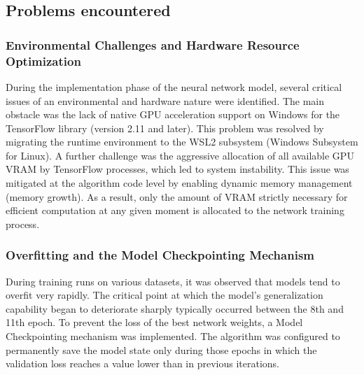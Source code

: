 \documentclass{article}
\begin{document}
\subsection{Problems encountered}
\subsubsection{Environmental Challenges and Hardware Resource Optimization}
During the implementation phase of the neural network model, several critical issues of an environmental and hardware nature were identified. The main obstacle was the lack of native GPU acceleration support on Windows for the TensorFlow library (version 2.11 and later). This problem was resolved by migrating the runtime environment to the WSL2 subsystem (Windows Subsystem for Linux).
A further challenge was the aggressive allocation of all available GPU VRAM by TensorFlow processes, which led to system instability. This issue was mitigated at the algorithm code level by enabling dynamic memory management (memory growth). As a result, only the amount of VRAM strictly necessary for efficient computation at any given moment is allocated to the network training process.
\subsubsection{ Overfitting and the Model Checkpointing Mechanism}
During training runs on various datasets, it was observed that models tend to overfit very rapidly. The critical point at which the model's generalization capability began to deteriorate sharply typically occurred between the 8th and 11th epoch.
To prevent the loss of the best network weights, a Model Checkpointing mechanism was implemented. The algorithm was configured to permanently save the model state only during those epochs in which the validation loss reaches a value lower than in previous iterations.
\end{document}
